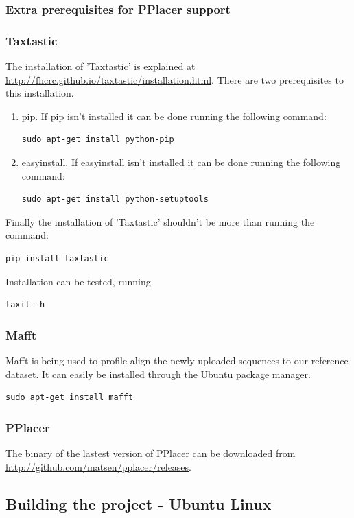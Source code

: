 \documentclass[a4paper, 11pt]{article} %
\begin{document}
\subsubsection{Extra prerequisites for PPlacer support}
\subsubsection*{Taxtastic}
The installation of 'Taxtastic' is explained at \url{http://fhcrc.github.io/taxtastic/installation.html}.
There are two prerequisites to this installation.
\begin{enumerate}
\item pip. If pip isn't installed it can be done running the following command:
\begin{verbatim}
sudo apt-get install python-pip
\end{verbatim}
\item easy\textunderscore install. If easy\textunderscore install isn't installed it can be done running the following command:
\begin{verbatim}
sudo apt-get install python-setuptools
\end{verbatim}
\end{enumerate}
Finally the installation of 'Taxtastic' shouldn't be more than running the command:
\begin{verbatim}
pip install taxtastic
\end{verbatim}
Installation can be tested, running
\begin{verbatim}
taxit -h
\end{verbatim}
\subsubsection*{Mafft}
Mafft is being used to profile align the newly uploaded sequences to our reference dataset. It can easily be installed through the Ubuntu package manager.
\begin{verbatim}
sudo apt-get install mafft
\end{verbatim}
\subsubsection*{PPlacer}
The binary of the lastest version of PPlacer can be downloaded from \url{http://github.com/matsen/pplacer/releases}.

\subsection{Building the project - Ubuntu Linux}
\end{document}
